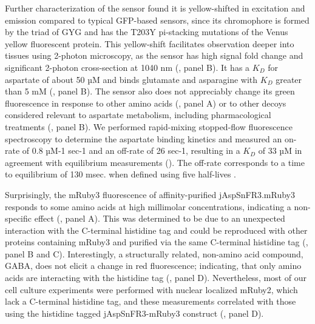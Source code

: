 \documentclass[9pt,lineno]{elife}
\begin{document}
Further characterization of the sensor found it is yellow-shifted in excitation and emission compared to typical GFP-based sensors, since its chromophore is formed by the triad of GYG and has the T203Y pi-stacking mutations of the Venus yellow fluorescent protein.
This yellow-shift facilitates observation deeper into tissues using 2-photon microscopy, as the sensor has high signal fold change and significant 2-photon cross-section at 1040 nm (, panel B).
It has a $K_D$ for aspartate of about 50 µM and binds glutamate and asparagine with $K_D$ greater than 5 mM (, panel B).
The sensor also does not appreciably change its green fluorescence in response to other amino acids (, panel A) or to other decoys considered relevant to aspartate metabolism, including pharmacological treatments (, panel B).
We performed rapid-mixing stopped-flow fluorescence spectroscopy to determine the aspartate binding kinetics and measured an on-rate of 0.8 µM-1 sec-1 and an off-rate of 26 sec-1, resulting in a $K_D$ of 33 µM in agreement with equilibrium measurements ().
The off-rate corresponds to a time to equilibrium of 130 msec. when defined using five half-lives \citep{Jarmoskaite2020-pj}.

Surprisingly, the mRuby3 fluorescence of affinity-purified jAspSnFR3.mRuby3 responds to some amino acids at high millimolar concentrations, indicating a non-specific effect (, panel A).
This was determined to be due to an unexpected interaction with the C-terminal histidine tag and could be reproduced with other proteins containing mRuby3 and purified via the same C-terminal histidine tag (, panel B and C).
Interestingly, a structurally related, non-amino acid compound, GABA, does not elicit a change in red fluorescence; indicating, that only amino acids are interacting with the histidine tag (, panel D).
Nevertheless, most of our cell culture experiments were performed with nuclear localized mRuby2, which lack a C-terminal histidine tag, and these measurements correlated with those using the histidine tagged jAspSnFR3-mRuby3 construct (, panel D).
\end{document}

